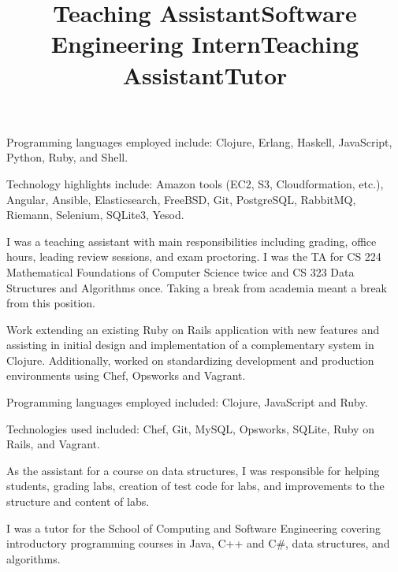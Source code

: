 \documentclass[margintitle,line]{res}
\begin{document}
\begin{resume}
\begin{position}
  Programming languages employed include:
  Clojure, Erlang, Haskell, JavaScript, Python, Ruby, and Shell.

  Technology highlights include: Amazon tools (EC2, S3, Cloudformation, etc.),
  Angular, Ansible, Elasticsearch, FreeBSD, Git, PostgreSQL, RabbitMQ, Riemann,
  Selenium, SQLite3, Yesod.
\end{position}

\title{Teaching Assistant}
\begin{position}
 I was a teaching assistant with main responsibilities including
 grading, office hours, leading review sessions, and exam
 proctoring. I was the TA for CS 224 Mathematical Foundations of
 Computer Science twice and CS 323 Data Structures and Algorithms
 once. Taking a break from academia meant a break from this position.
\end{position}

\title{Software Engineering Intern}
\begin{position}
 Work extending an existing Ruby on Rails application with new
 features and assisting in initial design and implementation of a
 complementary system in  Clojure. Additionally, worked on
 standardizing development and production environments using Chef,
 Opsworks and Vagrant.

 Programming languages employed included: Clojure, JavaScript and Ruby.

 Technologies used included: Chef, Git, MySQL, Opsworks, SQLite,
 Ruby on Rails, and Vagrant.
\end{position}


\title{Teaching Assistant}
\begin{position}
 As the assistant for a course on data structures, I was responsible
 for helping students, grading labs, creation of test code for labs,
 and improvements to the structure and content of labs.
\end{position}

\title{Tutor}
\begin{position}
I was a tutor for the School of Computing and Software Engineering
covering introductory programming courses in Java, C++ and C\#, data
structures, and algorithms.
\end{position}


\end{resume}
\end{document}
